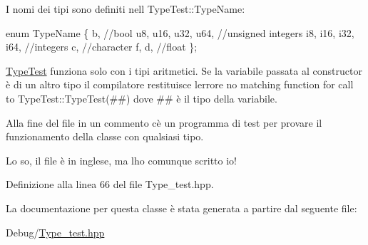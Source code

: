 I nomi dei tipi sono definiti nell {\ttfamily Type\+Test\+::\+Type\+Name}\+: 
\begin{DoxyCode}
\textcolor{keyword}{enum} TypeName \{
b,                   \textcolor{comment}{//bool}
u8, u16, u32, u64,   \textcolor{comment}{//unsigned integers}
i8, i16, i32, i64,   \textcolor{comment}{//integers}
c,                   \textcolor{comment}{//character}
f, d,                \textcolor{comment}{//float}
\};
\end{DoxyCode}


\hyperlink{struct_type_test}{Type\+Test} funziona solo con i tipi aritmetici. Se la variabile passata al constructor è di un altro tipo il compilatore restituisce l\textquotesingle{}errore {\ttfamily no matching function for call to \textquotesingle{}Type\+Test\+::\+Type\+Test(\#\#)} dove \#\# è il tipo della variabile.

Alla fine del file in un commento c\textquotesingle{}è un programma di test per provare il funzionamento della classe con qualsiasi tipo.

Lo so, il file è in inglese, ma l\textquotesingle{}ho comunque scritto io! 

Definizione alla linea 66 del file Type\+\_\+test.\+hpp.



La documentazione per questa classe è stata generata a partire dal seguente file\+:\begin{DoxyCompactItemize}
\item 
Debug/\hyperlink{_type__test_8hpp}{Type\+\_\+test.\+hpp}\end{DoxyCompactItemize}
